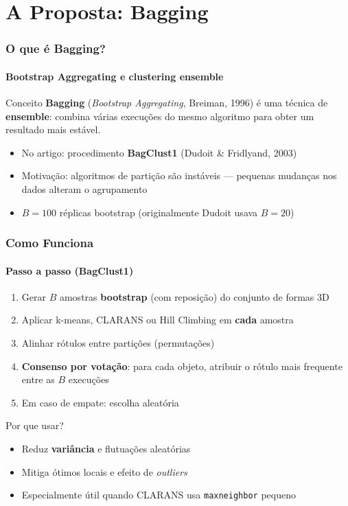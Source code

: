 \documentclass[brazilian,11pt]{beamer}
\begin{document}
\section[Bagging]{A Proposta: Bagging}

\begin{frame}
    \frametitle{O que é Bagging?}
    \framesubtitle{Bootstrap Aggregating e clustering ensemble}

    \begin{block}{Conceito}
        \textbf{Bagging} (\textit{Bootstrap Aggregating}, Breiman, 1996) é uma técnica de \textbf{ensemble}: combina várias execuções do mesmo algoritmo para obter um resultado mais estável.
    \end{block}

    \begin{itemize}
        \item No artigo: procedimento \textbf{BagClust1} (Dudoit \& Fridlyand, 2003)
        \item Motivação: algoritmos de partição são instáveis --- pequenas mudanças nos dados alteram o agrupamento
        \item $B = 100$ réplicas bootstrap (originalmente Dudoit usava $B=20$)
    \end{itemize}
\end{frame}

\begin{frame}
    \frametitle{Como Funciona}
    \framesubtitle{Passo a passo (BagClust1)}

    \begin{enumerate}
        \item Gerar $B$ amostras \textbf{bootstrap} (com reposição) do conjunto de formas 3D
        \item Aplicar k-means, CLARANS ou Hill Climbing em \textbf{cada} amostra
        \item Alinhar rótulos entre partições (permutações)
        \item \textbf{Consenso por votação}: para cada objeto, atribuir o rótulo mais frequente entre as $B$ execuções
        \item Em caso de empate: escolha aleatória
    \end{enumerate}

    \begin{alertblock}{Por que usar?}
        \begin{itemize}
            \item Reduz \textbf{variância} e flutuações aleatórias
            \item Mitiga ótimos locais e efeito de \textit{outliers}
            \item Especialmente útil quando CLARANS usa \texttt{maxneighbor} pequeno
        \end{itemize}
    \end{alertblock}
\end{frame}
\end{document}
